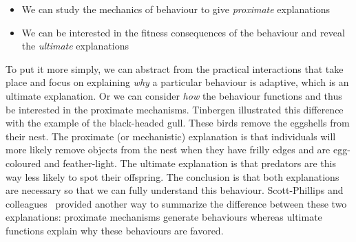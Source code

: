     \begin{itemize}
      \item {We can study the mechanics of behaviour to give \emph{proximate} explanations}
      \item {We can be interested in the fitness consequences of the behaviour and reveal the \emph{ultimate} explanations}
    \end{itemize}

    To put it more simply, we can abstract from the practical interactions that take place and focus on explaining \emph{why} a particular behaviour is adaptive, which is an ultimate explanation. Or we can consider \emph{how} the behaviour functions and thus be interested in the proximate mechanisms. Tinbergen illustrated this difference with the example of the black-headed gull. These birds remove the eggshells from their nest. The proximate (or mechanistic) explanation is that individuals will more likely remove objects from the nest when they have frilly edges and are egg-coloured and feather-light. The ultimate explanation is that predators are this way less likely to spot their offspring. The conclusion is that both explanations are necessary so that we can fully understand this behaviour. Scott-Phillips and colleagues~\parencite{Scott-Phillips2011} provided another way to summarize the difference between these two explanations: proximate mechanisms generate behaviours whereas ultimate functions explain why these behaviours are favored.

